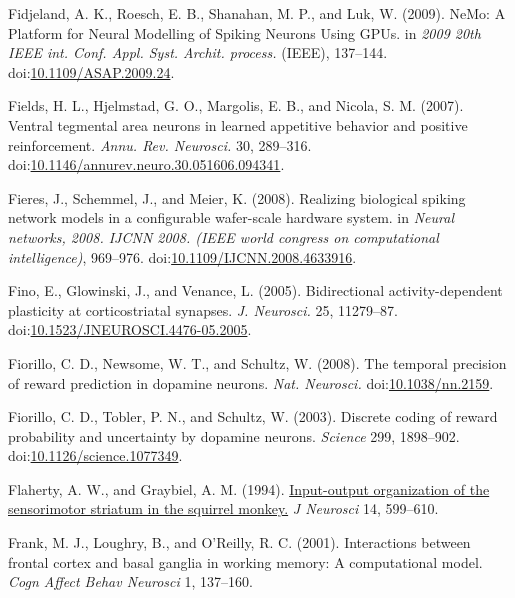 \documentclass[
  11pt,
  a4paper,
]{scrbook}
\newlength{\cslhangindent}
\newenvironment{CSLReferences}[2] %
 {\begin{list}{}{%
  \setlength{\itemindent}{0pt}
  \setlength{\leftmargin}{0pt}
  \setlength{\parsep}{0pt}
  \ifodd #1
   \setlength{\leftmargin}{\cslhangindent}
   \setlength{\itemindent}{-1\cslhangindent}
  \fi
  \setlength{\itemsep}{#2\baselineskip}}}
 {\end{list}}
\begin{document}
\begin{CSLReferences}{1}{1}
Fidjeland, A. K., Roesch, E. B., Shanahan, M. P., and Luk, W. (2009).
{NeMo: A Platform for Neural Modelling of Spiking Neurons Using GPUs}.
in \emph{2009 20th IEEE int. Conf. Appl. Syst. Archit. process.} (IEEE),
137--144.
doi:\href{https://doi.org/10.1109/ASAP.2009.24}{10.1109/ASAP.2009.24}.

Fields, H. L., Hjelmstad, G. O., Margolis, E. B., and Nicola, S. M.
(2007). {Ventral tegmental area neurons in learned appetitive behavior
and positive reinforcement.} \emph{Annu. Rev. Neurosci.} 30, 289--316.
doi:\href{https://doi.org/10.1146/annurev.neuro.30.051606.094341}{10.1146/annurev.neuro.30.051606.094341}.

Fieres, J., Schemmel, J., and Meier, K. (2008). Realizing biological
spiking network models in a configurable wafer-scale hardware system. in
\emph{Neural networks, 2008. IJCNN 2008. (IEEE world congress on
computational intelligence)}, 969--976.
doi:\href{https://doi.org/10.1109/IJCNN.2008.4633916}{10.1109/IJCNN.2008.4633916}.

Fino, E., Glowinski, J., and Venance, L. (2005). {Bidirectional
activity-dependent plasticity at corticostriatal synapses.} \emph{J.
Neurosci.} 25, 11279--87.
doi:\href{https://doi.org/10.1523/JNEUROSCI.4476-05.2005}{10.1523/JNEUROSCI.4476-05.2005}.

Fiorillo, C. D., Newsome, W. T., and Schultz, W. (2008). {The temporal
precision of reward prediction in dopamine neurons.} \emph{Nat.
Neurosci.} doi:\href{https://doi.org/10.1038/nn.2159}{10.1038/nn.2159}.

Fiorillo, C. D., Tobler, P. N., and Schultz, W. (2003). {Discrete coding
of reward probability and uncertainty by dopamine neurons.}
\emph{Science} 299, 1898--902.
doi:\href{https://doi.org/10.1126/science.1077349}{10.1126/science.1077349}.

Flaherty, A. W., and Graybiel, A. M. (1994).
\href{https://www.ncbi.nlm.nih.gov/pubmed/7507981}{Input-output
organization of the sensorimotor striatum in the squirrel monkey.}
\emph{J Neurosci} 14, 599--610.

Frank, M. J., Loughry, B., and O'Reilly, R. C. (2001). Interactions
between frontal cortex and basal ganglia in working memory: A
computational model. \emph{Cogn Affect Behav Neurosci} 1, 137--160.


\end{CSLReferences}
\end{document}
